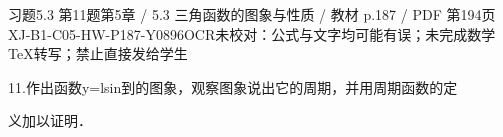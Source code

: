 \begin{bankitem}{习题5.3 第11题}{第5章 / 5.3 三角函数的图象与性质 / 教材 p.187 / PDF 第194页}{XJ-B1-C05-HW-P187-Y0896}{OCR未校对：公式与文字均可能有误；未完成数学TeX转写；禁止直接发给学生}
\begin{ocrdraft}
\par
11.作出函数y=lsin到的图象，观察图象说出它的周期，并用周期函数的定
\par
义加以证明．
\end{ocrdraft}
\end{bankitem}
